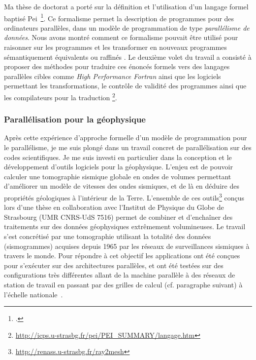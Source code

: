 \documentclass[11pt]{article}
\begin{document}
Ma thèse de doctorat \cite{icps-1997-4} a porté sur la définition et 
l'utilisation d'un langage formel baptis\'e Pei~\footcite{Violard92}. Ce 
formalisme permet la description de programmes pour des ordinateurs parallèles, 
dans un modèle de programmation de type \emph{parallélisme de données}. Nous 
avons montré comment ce formalisme pouvait être utilisé pour raisonner sur les 
programmes et les transformer en nouveaux programmes sémantiquement 
équivalents ou raffinés \cite{icps-1994-46,icps-1995-1,icps-1997-3,icps-1996-2}.
Le deuxième volet du travail a consisté à proposer des méthodes pour traduire
ces énoncés formels vers des langages parallèles cibles comme 
\textit{High Performance Fortran} ainsi que les logiciels permettant les 
transformations, le contrôle de validité des programmes ainsi que les 
compilateurs pour la traduction%
\footnote{\url{http://icps.u-strasbg.fr/pei/PEI_SUMMARY/langage.htm}}.


\subsubsection{Parallélisation pour la géophysique}

Après cette expérience d'approche formelle d'un modèle de programmation pour 
le parallélisme, je me suis plongé dans un travail concret de parallélisation 
sur des codes scientifiques. Je me suis investi en particulier dans la 
conception et le développement d'outils logiciels pour la géophysique. L'enjeu 
est de pouvoir calculer une tomographie sismique globale en ondes de volumes 
permettant d'améliorer un modèle de vitesses des ondes sismiques, et de là 
en déduire des propriétés géologiques à l'intérieur de la Terre. L'ensemble 
de ces outils\footnote{\url{http://renass.u-strasbg.fr/ray2mesh}} conçus lors 
d'une thèse en collaboration avec l'Institut de Physique du Globe de Strasbourg 
(UMR CNRS-UdS 7516) permet de combiner et d'enchaîner des traitements sur des 
données géophysiques extrêmement volumineuses. Le travail s'est concrétisé par 
une tomographie utilisant la totalité des données (sismogrammes) acquises 
depuis 1965 par les réseaux de surveillances sismiques à travers le monde. Pour 
répondre à cet objectif les applications ont été conçues pour s'exécuter sur 
des architectures parallèles, et ont été testées sur des configurations très 
différentes allant de la machine parallèle à des réseaux de station de travail 
en passant par des grilles de calcul (cf. paragraphe suivant) à l'échelle 
nationale~\cite{icps-2005-146,icps-2007-184}.  
\end{document}
